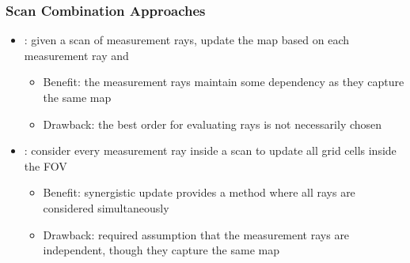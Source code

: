 \documentclass[11pt,professionalfonts,hyperref={pdftex,pdfpagemode=none,pdfstartview=FitH}]{beamer}
\renewcommand{\emph}[1]{\textit{\textbf{\color{blue}{#1}}}}
\begin{document}
\begin{frame}
\frametitle{Scan Combination Approaches}

\begin{itemize}
	\item \emph{Ray-By-Ray Update}: given a scan of measurement rays, update the map based on each measurement ray \emph{individually} and \emph{sequentially}
	\begin{itemize}
		\item Benefit: the measurement rays maintain some dependency as they capture the same map
		\item Drawback: the best order for evaluating rays is not necessarily chosen
	\end{itemize}
	\item \emph{Synergistic Update}: consider every measurement ray inside a scan \emph{simultaneously} to update all grid cells inside the FOV
	\begin{itemize}
		\item Benefit: synergistic update provides a method where all rays are considered simultaneously
		\item Drawback: required assumption that the measurement rays are independent, though they capture the same map
	\end{itemize}
\end{itemize}

\end{frame}
\end{document}
